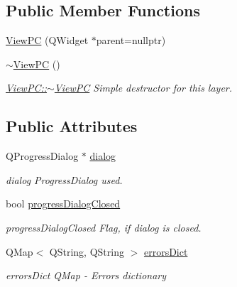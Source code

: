 \subsection*{Public Member Functions}
\begin{DoxyCompactItemize}
\item 
\hyperlink{class_view_p_c_a33c96c61f61042319c66c19059836b7f}{View\+PC} (Q\+Widget $\ast$parent=nullptr)
\item 
\hyperlink{class_view_p_c_a91c51f5c1e6ed5ab12b410339f469b0f}{$\sim$\+View\+PC} ()
\begin{DoxyCompactList}\small\item\em \hyperlink{class_view_p_c_a91c51f5c1e6ed5ab12b410339f469b0f}{View\+P\+C\+::$\sim$\+View\+PC} Simple destructor for this layer. \end{DoxyCompactList}\end{DoxyCompactItemize}
\subsection*{Public Attributes}
\begin{DoxyCompactItemize}
\item 
Q\+Progress\+Dialog $\ast$ \hyperlink{class_view_p_c_a31abbb470fe329b44e6ffee202b903ca}{dialog}
\begin{DoxyCompactList}\small\item\em dialog Progress\+Dialog used. \end{DoxyCompactList}\item 
bool \hyperlink{class_view_p_c_add8c82aa2b0b934212aa5bde9277ab36}{progress\+Dialog\+Closed}
\begin{DoxyCompactList}\small\item\em progress\+Dialog\+Closed Flag, if dialog is closed. \end{DoxyCompactList}\item 
Q\+Map$<$ Q\+String, Q\+String $>$ \hyperlink{class_view_p_c_aaf7f058e5589d65fec72a21abfd5629b}{errors\+Dict}
\begin{DoxyCompactList}\small\item\em errors\+Dict Q\+Map -\/ Errors dictionary \end{DoxyCompactList}\end{DoxyCompactItemize}
